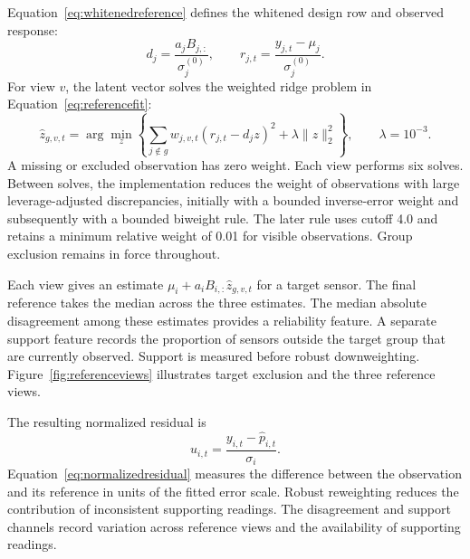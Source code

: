 Equation~\eqref{eq:whitenedreference} defines the whitened design row and observed response:
\begin{equation}
 d_j=\frac{a_j B_{j,:}}{\sigma_j^{(0)}},
 \qquad r_{j,t}=\frac{y_{j,t}-\mu_j}{\sigma_j^{(0)}}.\label{eq:whitenedreference}
\end{equation}
For view $v$, the latent vector solves the weighted ridge problem in Equation~\eqref{eq:referencefit}:
\begin{equation}
 \widehat z_{g,v,t}=\arg\min_z
 \left\{\sum_{j\notin g} w_{j,v,t}(r_{j,t}-d_jz)^2
       +\lambda\lVert z\rVert_2^2\right\},\qquad\lambda=10^{-3}.
 \label{eq:referencefit}
\end{equation}
A missing or excluded observation has zero weight. Each view performs six solves. Between solves, the implementation reduces the weight of observations with large leverage-adjusted discrepancies, initially with a bounded inverse-error weight and subsequently with a bounded biweight rule. The later rule uses cutoff 4.0 and retains a minimum relative weight of 0.01 for visible observations. Group exclusion remains in force throughout.

Each view gives an estimate $\mu_i+a_iB_{i,:}\widehat z_{g,v,t}$ for a target sensor. The final reference takes the median across the three estimates. The median absolute disagreement among these estimates provides a reliability feature. A separate support feature records the proportion of sensors outside the target group that are currently observed. Support is measured before robust downweighting. Figure~\ref{fig:referenceviews} illustrates target exclusion and the three reference views.

The resulting normalized residual is
\begin{equation}
 u_{i,t}=\frac{y_{i,t}-\widehat p_{i,t}}{\sigma_i}.\label{eq:normalizedresidual}
\end{equation}
Equation~\eqref{eq:normalizedresidual} measures the difference between the observation and its reference in units of the fitted error scale. Robust reweighting reduces the contribution of inconsistent supporting readings. The disagreement and support channels record variation across reference views and the availability of supporting readings.


